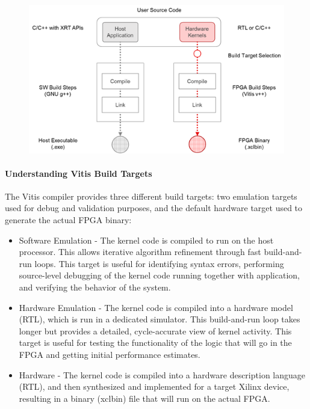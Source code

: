\begin{figure}[H]
	\begin{center}
		\includegraphics[width=5in]{images/part1_build_flow.png}
		\label{part1_build_flow}
	\end{center}
\end{figure}

\paragraph{Understanding Vitis Build Targets}
The Vitis compiler provides three different build targets: two emulation targets used for debug and validation purposes, and the default hardware target used to generate the actual FPGA binary:

\begin{itemize}
    \item Software Emulation - The kernel code is compiled to run on the host processor. This allows iterative algorithm refinement through fast build-and-run loops. This target is useful for identifying syntax errors, performing source-level debugging of the kernel code running together with application, and verifying the behavior of the system.
    \item Hardware Emulation - The kernel code is compiled into a hardware model (RTL), which is run in a dedicated simulator. This build-and-run loop takes longer but provides a detailed, cycle-accurate view of kernel activity. This target is useful for testing the functionality of the logic that will go in the FPGA and getting initial performance estimates.
    \item Hardware - The kernel code is compiled into a hardware description language (RTL), and then synthesized and implemented for a target Xilinx device, resulting in a binary (xclbin) file that will run on the actual FPGA.
\end{itemize}

